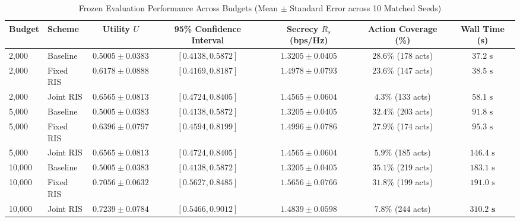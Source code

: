 \documentclass[journal,10pt,twocolumn]{IEEEtran}
\begin{document}
\begin{table}[t]
\centering
\caption{Frozen Evaluation Performance Across Budgets (Mean $\pm$ Standard Error across 10 Matched Seeds)}
\begin{tabular}{llccccc}
\toprule
Budget & Scheme & Utility $U$ & 95\% Confidence Interval & Secrecy $R_s$ (bps/Hz) & Action Coverage (\%) & Wall Time (s) \\
\midrule
2,000 & Baseline & $0.5005 \pm 0.0383$ & $[0.4138, 0.5872]$ & $1.3205 \pm 0.0405$ & $28.6\%$ (178 acts) & $37.2\text{ s}$ \\
2,000 & Fixed RIS & $0.6178 \pm 0.0888$ & $[0.4169, 0.8187]$ & $1.4978 \pm 0.0793$ & $23.6\%$ (147 acts) & $38.5\text{ s}$ \\
2,000 & Joint RIS & $0.6565 \pm 0.0813$ & $[0.4724, 0.8405]$ & $1.4565 \pm 0.0604$ & $4.3\%$ (133 acts) & $58.1\text{ s}$ \\
\midrule
5,000 & Baseline & $0.5005 \pm 0.0383$ & $[0.4138, 0.5872]$ & $1.3205 \pm 0.0405$ & $32.4\%$ (203 acts) & $91.8\text{ s}$ \\
5,000 & Fixed RIS & $0.6396 \pm 0.0797$ & $[0.4594, 0.8199]$ & $1.4996 \pm 0.0786$ & $27.9\%$ (174 acts) & $95.3\text{ s}$ \\
5,000 & Joint RIS & $0.6565 \pm 0.0813$ & $[0.4724, 0.8405]$ & $1.4565 \pm 0.0604$ & $5.9\%$ (185 acts) & $146.4\text{ s}$ \\
\midrule
10,000 & Baseline & $0.5005 \pm 0.0383$ & $[0.4138, 0.5872]$ & $1.3205 \pm 0.0405$ & $35.1\%$ (219 acts) & $183.1\text{ s}$ \\
10,000 & Fixed RIS & $0.7056 \pm 0.0632$ & $[0.5627, 0.8485]$ & $\mathbf{1.5656 \pm 0.0766}$ & $31.8\%$ (199 acts) & $191.0\text{ s}$ \\
10,000 & Joint RIS & $\mathbf{0.7239 \pm 0.0784}$ & $[0.5466, 0.9012]$ & $1.4839 \pm 0.0598$ & $\mathbf{7.8\%}$ (244 acts) & $\mathbf{310.2\text{ s}}$ \\
\bottomrule
\end{tabular}
\label{tab:results}
\end{table}
\end{document}
